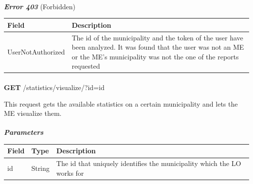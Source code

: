 						\paragraph{}
							\textit{\textbf{Error 403}} (Forbidden)
							\vspace{-2mm}
							\begin{table}[!h]
								\begin{tabular}{L{0.4\textwidth}L{0.4\textwidth}}
									\toprule
									\textbf{Field} & \textbf{Description} \\
									\midrule
								  	UserNotAuthorized & The id of the municipality and the token of the user have been analyzed. It was found that the user was not an ME or the ME's municipality was not the one of the reports requested \\
								 	\bottomrule
								\end{tabular}
							\end{table}
							
						\paragraph{}
						\textbf{GET} /statistics/visualize/?id={id}
						
						This request gets the available statistics on a certain municipality and lets the ME visualize them.
						\paragraph{}
							\textit{\textbf{Parameters}}
							\vspace{-2mm}
							\begin{table}[!h]
								\begin{tabular}{L{0.2\textwidth}L{0.2\textwidth}L{0.4\textwidth}}
									\toprule
									\textbf{Field} & \textbf{Type} & \textbf{Description} \\
									\midrule
								 	id & String & The id that uniquely identifies the municipality which the LO works for \\
								 	\bottomrule
								\end{tabular}
							\end{table}

